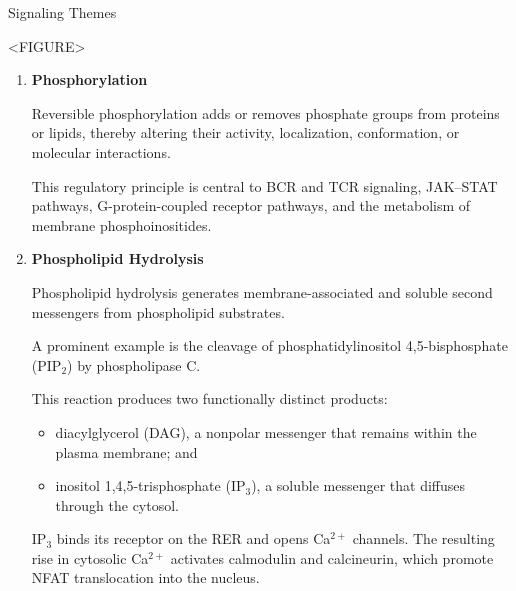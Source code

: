     \begin{core}{Signaling Themes}

      <FIGURE>

      \begin{enumerate}

        \item \textbf{Phosphorylation} 

          Reversible phosphorylation adds or removes phosphate groups from proteins or lipids, thereby altering their activity, localization, conformation, or molecular interactions.

          This regulatory principle is central to BCR and TCR signaling, JAK--STAT pathways, G-protein-coupled receptor pathways, and the metabolism of membrane phosphoinositides.

        \item \textbf{Phospholipid Hydrolysis}

          Phospholipid hydrolysis generates membrane-associated and soluble second messengers from phospholipid substrates.

          A prominent example is the cleavage of phosphatidylinositol 4,5-bisphosphate (PIP$_2$) by phospholipase C.

          This reaction produces two functionally distinct products:

          \begin{itemize}

            \item diacylglycerol (DAG), a nonpolar messenger that remains within the plasma membrane; and

            \item inositol 1,4,5-trisphosphate (IP$_3$), a soluble messenger that diffuses through the cytosol.

          \end{itemize}

          IP$_3$ binds its receptor on the RER and opens Ca$^{2+}$ channels. The resulting rise in cytosolic Ca$^{2+}$ activates calmodulin and calcineurin, which promote NFAT translocation into the nucleus.


\end{enumerate}
\end{core}
